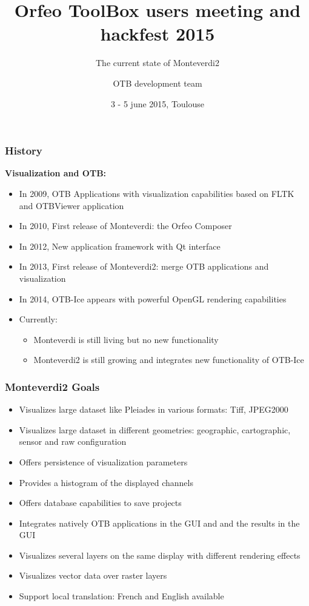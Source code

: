 \documentclass[8pt]{beamer}
\title{Orfeo ToolBox users meeting and hackfest 2015}
\subtitle{The current state of Monteverdi2}
\author{OTB development team}%
\date{3 - 5 june 2015, Toulouse}
\begin{document}
\begin{frame}
\titlepage
\end{frame}

\begin{frame}
\frametitle{History}
\textbf{Visualization and OTB:}
\begin{itemize}
    \item In 2009, OTB Applications with visualization capabilities based on FLTK and OTBViewer application
    \item In 2010, First release of Monteverdi: the Orfeo Composer
    \item In 2012, New application framework with Qt interface
    \item In 2013, First release of Monteverdi2: merge OTB applications and visualization
    \item In 2014, OTB-Ice appears with powerful OpenGL rendering capabilities
    \item Currently:
    \begin{itemize}
        \item Monteverdi is still living but no new functionality
        \item Monteverdi2 is still growing and integrates new functionality of OTB-Ice
    \end{itemize} 
\end{itemize} 
\end{frame}

\begin{frame}
\frametitle{Monteverdi2 Goals}
\begin{itemize}
    \item Visualizes large dataset like Pleiades in various formats: Tiff, JPEG2000
    \item Visualizes large dataset in different geometries: geographic, cartographic, sensor and raw configuration
    \item Offers persistence of visualization parameters
    \item Provides a histogram of the displayed channels
    \item Offers database capabilities to save projects
    \item Integrates natively OTB applications in the GUI and and the results in the GUI
    \item Visualizes several layers on the same display with different rendering effects
    \item Visualizes vector data over raster layers 
    \item Support local translation: French and English available
\end{itemize} 
\end{frame}
\end{document}
